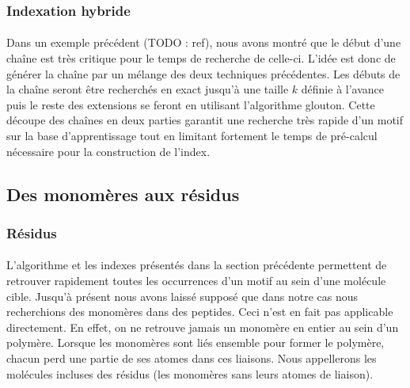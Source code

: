 \documentclass[12pt,french,twoside]{report}
\begin{document}
\subsubsection{Indexation hybride}

\paragraph{}Dans un exemple précédent (TODO : ref), nous avons montré que le début d'une chaîne est très critique pour le temps
de recherche de celle-ci. L'idée est donc de générer la chaîne par un mélange des deux techniques précédentes. Les débuts de la 
chaîne seront être recherchés en exact jusqu'à une taille $k$ définie à l'avance puis le reste des extensions se feront en
utilisant l'algorithme glouton. Cette découpe des chaînes en deux parties garantit une recherche très rapide d'un
motif sur la base d'apprentissage tout en limitant fortement le temps de pré-calcul nécessaire pour la construction de l'index.



\subsection{Des monomères aux résidus}


\subsubsection{Résidus}

\paragraph{}L'algorithme et les indexes présentés dans la section précédente permettent de retrouver rapidement toutes les
occurrences d'un motif au sein d'une molécule cible. Jusqu'à présent nous avons laissé supposé que dans notre cas
nous recherchions des monomères dans des peptides. Ceci n'est en fait pas applicable directement. En effet, on ne retrouve jamais
un monomère en entier au sein d'un polymère. Lorsque les monomères sont liés ensemble pour former le polymère, chacun perd une
partie de ses atomes dans ces liaisons. Nous appellerons les molécules incluses des résidus (les monomères sans leurs atomes de
liaison).
\end{document}
